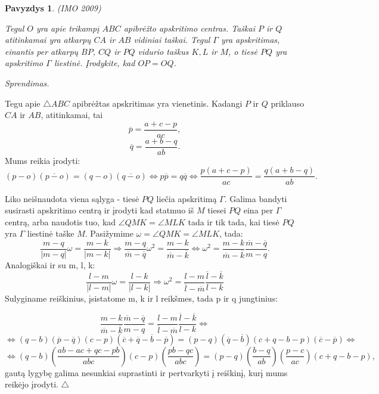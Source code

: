 \documentclass[11pt,a4paper,twoside]{book}
\newenvironment{sprendimas}{\noindent \textit{Sprendimas.}}{\hfill $\triangle$}
\newcounter{foo}[subsection]
\newtheorem{pavnr}[foo]{Pavyzdys}
\theoremstyle{definition} \newtheorem*{api}{Apibrėžimas}
\theoremstyle{remark} \newtheorem*{pastaba}{Pastaba}
\begin{document}
\begin{pavnr}
(IMO 2009)

Tegul $O$ yra apie trikampį $ABC$ apibrėžto apskritimo centras. Taškai $P$ ir $Q$ atitinkamai yra atkarpų $CA$ ir $AB$ vidiniai taškai. Tegul $\Gamma$ yra apskritimas, einantis per atkarpų $BP$, $CQ$ ir $PQ$ vidurio taškus $K, L$ ir $M$, o tiesė $PQ$ yra apskritimo $\Gamma$ liestinė. Įrodykite, kad $OP = OQ$.
\end{pavnr}
\begin{sprendimas}

Tegu apie $\bigtriangleup ABC$ apibrėžtas apskritimas yra vienetinis. Kadangi $P$ ir $Q$ priklauso $CA$ ir $AB$, atitinkamai, tai
$$\overline{p}=\frac{a+c-p}{ac},$$
$$\overline{q}=\frac{a+b-q}{ab}.$$
Mums reikia įrodyti:
$$(p-o)(\overline{p-o})=(q-o)(\overline{q-o}) \Leftrightarrow p\overline{p}=q\overline{q} \Leftrightarrow \frac{p(a+c-p)}{ac}=\frac{q(a+b-q)}{ab}.$$

Liko neišnaudota viena sąlyga - tiesė $PQ$ liečia apskritimą $\Gamma$. Galima bandyti susirasti apskritimo centrą ir įrodyti kad statmuo iš $M$ tiesei $PQ$ eina per $\Gamma$ centrą, arba naudotis tuo, kad $\angle QMK=\angle MLK$ tada ir tik tada, kai tiesė $PQ$ yra $\Gamma$ liestinė taške $M$. Pasižymime $\omega=\angle QMK=\angle MLK$, tada:
$$\frac{m-q}{|m-q|}\omega=\frac{m-k}{|m-k|} \Rightarrow \frac{m-q}{\overline{m}-\overline{q}}\omega^2=\frac{m-k}{\overline{m}-\overline{k}} \Leftrightarrow \omega^2=\frac{m-k}{\overline{m}-\overline{k}} \frac{\overline{m}-\overline{q}}{m-q}.$$
Analogiškai ir su m, l, k:
$$\frac{l-m}{|l-m|}\omega=\frac{l-k}{|l-k|} \Rightarrow  \omega^2=\frac{l-m}{\overline{l}-\overline{m}}\frac{\overline{l}-\overline{k}}{l-k}$$
Sulyginame reiškinius, įsistatome m, k ir l reikšmes, tada p ir q jungtinius:

\begin{equation*}
 \frac{m-k}{\overline{m}-\overline{k}} \frac{\overline{m}-\overline{q}}{m-q}=\frac{l-m}{\overline{l}-\overline{m}}\frac{\overline{l}-\overline{k}}{l-k} \Leftrightarrow 
\end{equation*}
\begin{equation*}
 \Leftrightarrow (q-b)(\overline{p}-\overline{q})(c-p)(\overline{c}+\overline{q}-\overline{b}-\overline{p})=(p-q)(\overline{q}-\overline{b})(c+q-b-p)(\overline{c}-\overline{p}) \Leftrightarrow
\end{equation*}
\begin{equation*}
\Leftrightarrow (q-b)(\frac{ab-ac+qc-pb}{abc})(c-p)(\frac{pb-qc}{abc})=(p-q)(\frac{b-q}{ab})(\frac{p-c}{ac})(c+q-b-p),
\end{equation*}
gautą lygybę galima nesunkiai suprastinti ir pertvarkyti į reiškinį, kurį mums reikėjo įrodyti.
\end{sprendimas}
\end{document}
